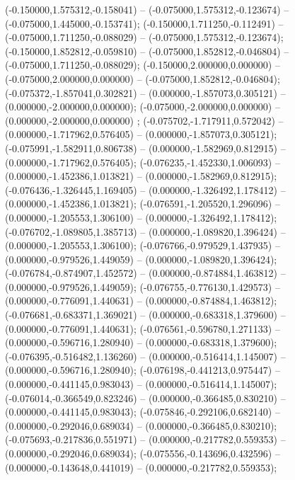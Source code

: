  (-0.150000,1.575312,-0.158041) -- (-0.075000,1.575312,-0.123674) -- (-0.075000,1.445000,-0.153741);
 (-0.150000,1.711250,-0.112491) -- (-0.075000,1.711250,-0.088029) -- (-0.075000,1.575312,-0.123674);
 (-0.150000,1.852812,-0.059810) -- (-0.075000,1.852812,-0.046804) -- (-0.075000,1.711250,-0.088029);
 (-0.150000,2.000000,0.000000) -- (-0.075000,2.000000,0.000000) -- (-0.075000,1.852812,-0.046804);
 (-0.075372,-1.857041,0.302821) -- (0.000000,-1.857073,0.305121) -- (0.000000,-2.000000,0.000000);
 (-0.075000,-2.000000,0.000000) -- (0.000000,-2.000000,0.000000) ;
 (-0.075702,-1.717911,0.572042) -- (0.000000,-1.717962,0.576405) -- (0.000000,-1.857073,0.305121);
 (-0.075991,-1.582911,0.806738) -- (0.000000,-1.582969,0.812915) -- (0.000000,-1.717962,0.576405);
 (-0.076235,-1.452330,1.006093) -- (0.000000,-1.452386,1.013821) -- (0.000000,-1.582969,0.812915);
 (-0.076436,-1.326445,1.169405) -- (0.000000,-1.326492,1.178412) -- (0.000000,-1.452386,1.013821);
 (-0.076591,-1.205520,1.296096) -- (0.000000,-1.205553,1.306100) -- (0.000000,-1.326492,1.178412);
 (-0.076702,-1.089805,1.385713) -- (0.000000,-1.089820,1.396424) -- (0.000000,-1.205553,1.306100);
 (-0.076766,-0.979529,1.437935) -- (0.000000,-0.979526,1.449059) -- (0.000000,-1.089820,1.396424);
 (-0.076784,-0.874907,1.452572) -- (0.000000,-0.874884,1.463812) -- (0.000000,-0.979526,1.449059);
 (-0.076755,-0.776130,1.429573) -- (0.000000,-0.776091,1.440631) -- (0.000000,-0.874884,1.463812);
 (-0.076681,-0.683371,1.369021) -- (0.000000,-0.683318,1.379600) -- (0.000000,-0.776091,1.440631);
 (-0.076561,-0.596780,1.271133) -- (0.000000,-0.596716,1.280940) -- (0.000000,-0.683318,1.379600);
 (-0.076395,-0.516482,1.136260) -- (0.000000,-0.516414,1.145007) -- (0.000000,-0.596716,1.280940);
 (-0.076198,-0.441213,0.975447) -- (0.000000,-0.441145,0.983043) -- (0.000000,-0.516414,1.145007);
 (-0.076014,-0.366549,0.823246) -- (0.000000,-0.366485,0.830210) -- (0.000000,-0.441145,0.983043);
 (-0.075846,-0.292106,0.682140) -- (0.000000,-0.292046,0.689034) -- (0.000000,-0.366485,0.830210);
 (-0.075693,-0.217836,0.551971) -- (0.000000,-0.217782,0.559353) -- (0.000000,-0.292046,0.689034);
 (-0.075556,-0.143696,0.432596) -- (0.000000,-0.143648,0.441019) -- (0.000000,-0.217782,0.559353);
